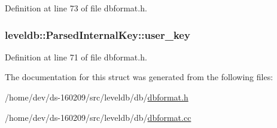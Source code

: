 Definition at line 73 of file dbformat.\+h.

\hypertarget{structleveldb_1_1_parsed_internal_key_aa6e30fcf3c95fc1485d60fa08efe2b9d}{}
\subsubsection[{user\+\_\+key}]{ leveldb\+::\+Parsed\+Internal\+Key\+::user\+\_\+key}\label{structleveldb_1_1_parsed_internal_key_aa6e30fcf3c95fc1485d60fa08efe2b9d}


Definition at line 71 of file dbformat.\+h.



The documentation for this struct was generated from the following files\+:\begin{DoxyCompactItemize}
\item 
/home/dev/ds-\/160209/src/leveldb/db/\hyperlink{dbformat_8h}{dbformat.\+h}\item 
/home/dev/ds-\/160209/src/leveldb/db/\hyperlink{dbformat_8cc}{dbformat.\+cc}\end{DoxyCompactItemize}
